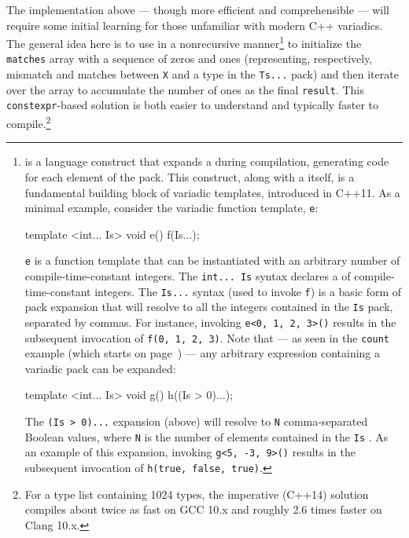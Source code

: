 \noindent The implementation above --- though more efficient and comprehensible
--- will require some initial learning for those unfamiliar with modern
C++ variadics. The general idea here \pagebreak%
 is to use 
in a nonrecursive manner{\cprotect\footnote{ is
a language construct that expands a  during
compilation, generating code for each element of the pack. This
construct, along with a  itself, is a
  fundamental building block of variadic templates,
  introduced in C++11. As a minimal example, consider the variadic
  function template, \lstinline!e!:

  \begin{emcppslisting}[style=footcode]
  template <int... Is> void e() { f(Is...); }
  \end{emcppslisting}
      
\noindent \lstinline!e! is a function template that can be instantiated
  with an arbitrary number of compile-time-constant integers. The
  \lstinline!int...!~\lstinline!Is! syntax declares a 
  of compile-time-constant integers. The \lstinline!Is...! syntax (used to
  invoke \lstinline!f!) is a basic form of pack expansion that will resolve
  to all the integers contained in the \lstinline!Is! pack, separated by
  commas. For instance, invoking
  \lstinline!e<0,!~\lstinline!1,!~\lstinline!2,!~\lstinline!3>()! results in the
  subsequent invocation of
  \lstinline!f(0,!~\lstinline!1,!~\lstinline!2,!~\lstinline!3)!. Note that --- as
  seen in the \lstinline!count! example (which starts on page~\pageref{relaxedconstexpr-countcode}) --- any arbitrary
  expression containing a variadic pack can be expanded:

  \begin{emcppslisting}[style=footcode]
  template <int... Is> void g() { h((Is > 0)...); }
  \end{emcppslisting}
      
\noindent The \lstinline!(Is!~\lstinline!>!~\lstinline!0)...! expansion (above) will
  resolve to \lstinline!N! comma-separated Boolean values, where \lstinline!N!
  is the number of elements contained in the \lstinline!Is!
  . As an example of this expansion, invoking
  \lstinline!g<5,!~\lstinline!-3,!~\lstinline!9>()! results in the subsequent invocation of \lstinline!h(true,!~\lstinline!false,!~\lstinline!true)!.}} to
initialize the \lstinline!matches! array with a sequence of zeros and ones
(representing, respectively, mismatch and matches between \lstinline!X! and
a type in the \lstinline!Ts...! pack) and then iterate over the array to
accumulate the number of ones as the final \lstinline!result!. This
\lstinline!constexpr!-based solution is both easier to understand and
typically faster to compile.{\cprotect\footnote{For a type list
containing 1024 types, the imperative (C++14) solution compiles about
twice as fast on GCC 10.x and roughly 2.6 times faster on Clang
  10.x.}}


